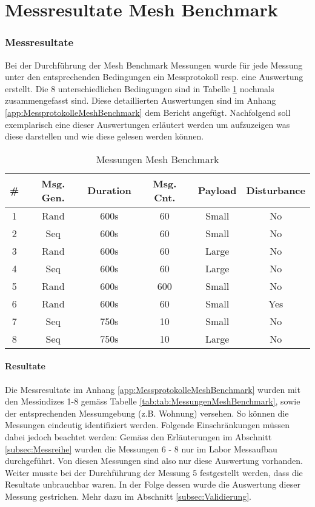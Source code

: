 \vspace*{4cm}
\part{Messresultate Mesh Benchmark}\label{part:MessresultateMeshBenchmark}
\vspace*{\fill}
\clearpage

\section{Messresultate}\label{sec:Messresultate}
Bei der Durchführung der Mesh Benchmark Messungen wurde für jede Messung unter den entsprechenden Bedingungen ein Messprotokoll resp. eine Auswertung erstellt. Die 8 unterschiedlichen Bedingungen sind in Tabelle \ref{tab:MessungenMeshBenchmark} nochmals zusammengefasst sind.
Diese detaillierten Auswertungen sind im Anhang \ref{app:MessprotokolleMeshBenchmark} dem Bericht angefügt.
Nachfolgend soll exemplarisch eine dieser Auswertungen erläutert werden um aufzuzeigen was diese darstellen und wie diese gelesen werden können.

\begin{table}[h]
\centering
\begin{tabular}{|c|c|c|c|c|c|} 
\hline
\textbf{\#}  & \textbf{Msg. Gen.}  & \textbf{Duration}  & \textbf{Msg. Cnt.}  & \textbf{Payload }  & \textbf{Disturbance}  \\ 
\hline
1 & Rand & 600s & 60 & Small & No \\ 
\hline
2 & Seq & 600s & 60 & Small & No \\ 
\hline
3 & Rand & 600s & 60 & Large & No \\ 
\hline
4 & Seq & 600s & 60 & Large & No \\ 
\hline
5 & Rand & 600s & 600 & Small & No \\ 
\hline
6 & Rand & 600s & 60 & Small & Yes \\ 
\hline
7 & Seq & 750s & 10 & Small & No \\ 
\hline
8 & Seq & 750s & 10 & Large & No \\
\hline
\end{tabular}
\caption{Messungen Mesh Benchmark}
\label{tab:MessungenMeshBenchmark}
\end{table}


\subsection{Resultate}\label{subsec:Resultate}
Die Messresultate im Anhang \ref{app:MessprotokolleMeshBenchmark} wurden mit den Messindizes 1-8 gemäss Tabelle \ref{tab:tab:MessungenMeshBenchmark}, sowie der entsprechenden Messumgebung (z.B. Wohnung) versehen.
So können die Messungen eindeutig identifiziert werden.
Folgende Einschränkungen müssen dabei jedoch beachtet werden:
Gemäss den Erläuterungen im Abschnitt \ref{subsec:Messreihe} wurden die Messungen 6 - 8 nur im Labor Messaufbau durchgeführt. Von diesen Messungen sind also nur diese Auswertung vorhanden.
Weiter musste bei der Durchführung der Messung 5 festgestellt werden, dass die Resultate unbrauchbar waren.
In der Folge dessen wurde die Auswertung dieser Messung gestrichen. Mehr dazu im Abschnitt  \ref{subsec:Validierung}.


